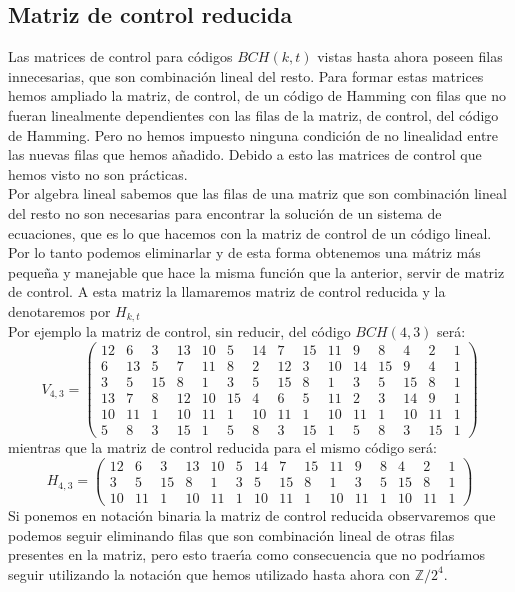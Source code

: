%
%

\subsection{Matriz de control reducida}

Las matrices de control para c\'odigos $BCH(k,t)$ vistas hasta ahora poseen
filas innecesarias, que son combinaci\'on lineal del resto. Para formar estas
matrices hemos ampliado la matriz, de control, de un c\'odigo de Hamming con
filas que no fueran linealmente dependientes con las filas de la matriz, de
control, del c\'odigo de Hamming. Pero no hemos impuesto ninguna condici\'on
de no linealidad entre las nuevas filas que hemos a\~nadido. Debido a esto
las matrices de control que hemos visto no son pr\'acticas.\\

Por algebra lineal sabemos que las filas de una matriz que son combinaci\'on
lineal del resto no son necesarias para encontrar la soluci\'on de un
sistema de ecuaciones, que es lo que hacemos con la matriz de control de un
c\'odigo lineal. Por lo tanto podemos eliminarlar y de esta forma obtenemos
una m\'atriz m\'as peque\~na y manejable que hace la misma funci\'on que la
anterior, servir de matriz de control. A esta matriz la llamaremos 
matriz de control reducida y la denotaremos por $H_{k,t}$\\

Por ejemplo la matriz de control, sin reducir, del c\'odigo $BCH(4,3)$
ser\'a:
\begin{displaymath}
V_{4,3} =
\left( \begin{array}{ccccccccccccccccc}
12&6&3&13&10&5&14&7&15&11&9&8&4&2&1\\
6&13&5&7&11&8&2&12&3&10&14&15&9&4&1\\
3&5&15&8&1&3&5&15&8&1&3&5&15&8&1\\
13&7&8&12&10&15&4&6&5&11&2&3&14&9&1\\
10&11&1&10&11&1&10&11&1&10&11&1&10&11&1\\
5&8&3&15&1&5&8&3&15&1&5&8&3&15&1
\end{array} \right)
\end{displaymath}
mientras que la matriz de control reducida para el mismo c\'odigo ser\'a:
\begin{displaymath}
H_{4,3} =
\left( \begin{array}{ccccccccccccccccc}
12&6&3&13&10&5&14&7&15&11&9&8&4&2&1\\
3&5&15&8&1&3&5&15&8&1&3&5&15&8&1\\
10&11&1&10&11&1&10&11&1&10&11&1&10&11&1
\end{array} \right)
\end{displaymath}
Si ponemos en notaci\'on binaria la matriz de control reducida observaremos
que podemos seguir eliminando filas que son combinaci\'on lineal de otras
filas presentes en la matriz, pero esto traer\'{\i}a como consecuencia que
no podr\'{\i}amos seguir utilizando la notaci\'on que hemos utilizado hasta
ahora con $\mathbb{Z}/2^4$.\\

